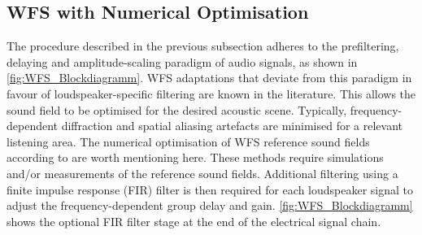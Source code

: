 \subsection{WFS with Numerical Optimisation}

The procedure described in the previous subsection adheres
to the prefiltering, delaying and amplitude-scaling paradigm of audio
signals, as shown in \myfig\ref{fig:WFS_Blockdiagramm}.
%
WFS adaptations that deviate from this paradigm in favour
of loudspeaker-specific filtering are known in the literature.
%
This allows the sound field to be optimised for the desired acoustic scene.
Typically, frequency-dependent diffraction and spatial aliasing artefacts
are minimised for a relevant listening area.
%
The numerical optimisation of WFS reference sound fields
according to
\cite{Gauthier2006_JASA,Gauthier2007_JAES,Corteel2006_JAES}
are worth mentioning here.
%
These methods require simulations and/or measurements
of the reference sound fields.
%
Additional filtering using a finite impulse response (FIR) filter
is then required for each loudspeaker signal to adjust
the frequency-dependent group delay and gain.
%
\myfig\ref{fig:WFS_Blockdiagramm} shows the optional FIR filter stage
at the end of the electrical signal chain.




